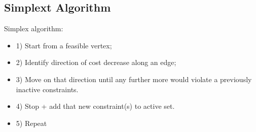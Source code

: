 \subsection{Simplext Algorithm}
Simplex algorithm:
\begin{itemize}
	\item 1) Start from a feasible vertex;
	
	\item 2) Identify direction of cost decrease along an edge;
	
	\item 3) Move on that direction until any further more would violate a previously inactive constraints.
	
	\item 4) Stop + add that new constraint(s) to active set.
	
	\item 5) Repeat
\end{itemize}

















